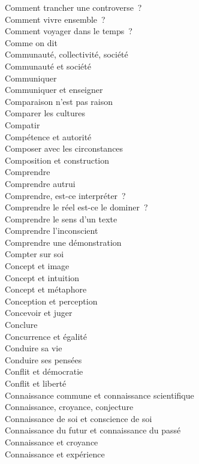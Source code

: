 \documentclass[a4paper,12pt]{article}
\begin{document}
Comment trancher une controverse ? \\
Comment vivre ensemble ? \\
Comment voyager dans le temps ? \\
Comme on dit \\
Communauté, collectivité, société \\
Communauté et société \\
Communiquer \\
Communiquer et enseigner \\
Comparaison n'est pas raison \\
Comparer les cultures \\
Compatir \\
Compétence et autorité \\
Composer avec les circonstances \\
Composition et construction \\
Comprendre \\
Comprendre autrui \\
Comprendre, est-ce interpréter ? \\
Comprendre le réel est-ce le dominer ? \\
Comprendre le sens d'un texte \\
Comprendre l'inconscient \\
Comprendre une démonstration \\
Compter sur soi \\
Concept et image \\
Concept et intuition \\
Concept et métaphore \\
Conception et perception \\
Concevoir et juger \\
Conclure \\
Concurrence et égalité \\
Conduire sa vie \\
Conduire ses pensées \\
Conflit et démocratie \\
Conflit et liberté \\
Connaissance commune et connaissance scientifique \\
Connaissance, croyance, conjecture \\
Connaissance de soi et conscience de soi \\
Connaissance du futur et connaissance du passé \\
Connaissance et croyance \\
Connaissance et expérience \\
\end{document}
